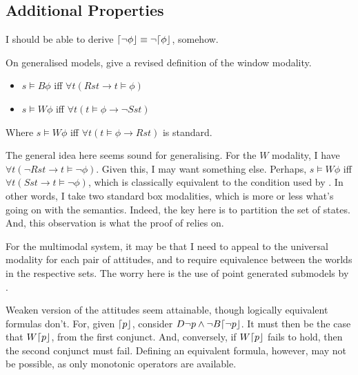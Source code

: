 \documentclass[10pt]{article}
\begin{document}
\newpage

\subsection{Additional Properties}
\label{sec:addit-prop}

I should be able to derive \(\mathord{\lceil{\lnot \phi}\rfloor} \equiv \lnot\mathord{\lceil{\phi}\rfloor}\), somehow.



On generalised models, \citeauthor{Gargov:1987aa} give a revised definition of the window modality.

\begin{itemize}
\item \(s \vDash B\phi\) iff \(\forall t(Rst \rightarrow t \vDash \phi)\)
\item \(s \vDash W\phi\) iff \(\forall t(t \vDash \phi \rightarrow \lnot Sst)\)
\end{itemize}

Where \(s \vDash W\phi\) iff \(\forall t(t \vDash \phi \rightarrow Rst)\) is standard.

The general idea here seems sound for generalising.
For the \(W\) modality, I have \(\forall t(\lnot Rst \rightarrow t \vDash \lnot\phi)\).
Given this, I may want something else.
Perhaps, \(s \vDash W\phi \) iff \(\forall t(Sst \rightarrow t \vDash \lnot\phi)\), which is classically equivalent to the condition used by \citeauthor{Gargov:1987aa}.
In other words, I take two standard box modalities, which is more or less what's going on with the semantics.
Indeed, the key here is to partition the set of states.
And, this observation is what the proof of \citeauthor{Gargov:1987aa} relies on.

For the multimodal system, it may be that I need to appeal to the universal modality for each pair of attitudes, and to require equivalence between the worlds in the respective sets.
The worry here is the use of point generated submodels by \citeauthor{Gargov:1987aa}.

\begin{note}
  Weaken version of the attitudes seem attainable, though logically equivalent formulas don't.
  For, given \(\mathord{\lceil{p}\rfloor}\), consider \(D\lnot p \land \lnot B\mathord{\lceil{\lnot p}\rfloor}\).
  It must then be the case that \(W\mathord{\lceil{p}\rfloor}\), from the first conjunct.
  And, conversely, if \(W\mathord{\lceil{p}\rfloor}\) fails to hold, then the second conjunct must fail.
  Defining an equivalent formula, however, may not be possible, as only monotonic operators are available.
\end{note}
\end{document}
